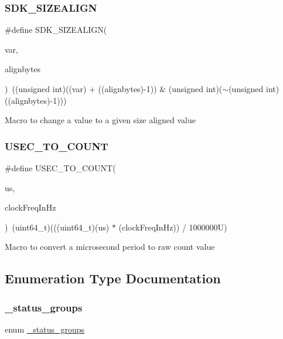 \subsubsection{\texorpdfstring{SDK\_SIZEALIGN}{SDK\_SIZEALIGN}}
{\footnotesize\ttfamily \#define S\+D\+K\+\_\+\+S\+I\+Z\+E\+A\+L\+I\+GN(\begin{DoxyParamCaption}\item[{}]{var,  }\item[{}]{alignbytes }\end{DoxyParamCaption})~((unsigned int)((var) + ((alignbytes)-\/1)) \& (unsigned int)($\sim$(unsigned int)((alignbytes)-\/1)))}

Macro to change a value to a given size aligned value \mbox{\label{group__ksdk__common_gad5639aadf668899775fc7506a5e19dc1}} 
\subsubsection{\texorpdfstring{USEC\_TO\_COUNT}{USEC\_TO\_COUNT}}
{\footnotesize\ttfamily \#define U\+S\+E\+C\+\_\+\+T\+O\+\_\+\+C\+O\+U\+NT(\begin{DoxyParamCaption}\item[{}]{us,  }\item[{}]{clock\+Freq\+In\+Hz }\end{DoxyParamCaption})~(uint64\+\_\+t)(((uint64\+\_\+t)(us) $\ast$ (clock\+Freq\+In\+Hz)) / 1000000\+U)}

Macro to convert a microsecond period to raw count value 

\subsection{Enumeration Type Documentation}
\mbox{\label{group__ksdk__common_ga7ff0b98bb1341c07acefb1473b6eda29}} 
\subsubsection{\texorpdfstring{\_status\_groups}{\_status\_groups}}
{\footnotesize\ttfamily enum \mbox{\hyperlink{group__ksdk__common_ga7ff0b98bb1341c07acefb1473b6eda29}{\+\_\+status\+\_\+groups}}}



